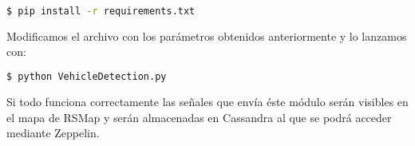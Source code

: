 \begin{lstlisting}[language=bash,caption={Instalar epenencias},label={lst:pi1}]
$ pip install -r requirements.txt
\end{lstlisting}

Modificamos el archivo con los parámetros obtenidos anteriormente y lo lanzamos con:

\begin{lstlisting}[language=bash,caption={Instalar epenencias},label={lst:pi1}]
$ python VehicleDetection.py
\end{lstlisting}

Si todo funciona correctamente las señales que envía éste módulo serán visibles en el mapa de RSMap y serán almacenadas en Cassandra al que se podrá acceder mediante Zeppelin.
